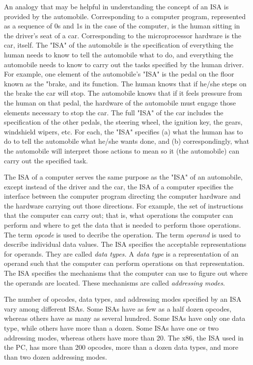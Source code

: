 \documentclass{patt}
\begin{document}
An analogy that may be helpful in understanding the concept of an ISA is
provided by the automobile.  Corresponding to a computer program, 
represented as a sequence of 0s and 1s in the case of the computer, is 
the human sitting in the driver's seat of a car.  Corresponding to the 
microprocessor hardware is the car, itself.  The "ISA" of the automobile is 
the specification of everything 
the human needs to know to tell the automobile what to do, and everything 
the automobile needs to know to carry out the tasks specified by the human 
driver.  For example, one element of the automobile's "ISA" is the pedal 
on the floor known as the "brake, and its function.  The human knows that 
if he/she steps on the brake the car will stop.  The automobile knows that 
if it feels pressure from the human on that pedal, the hardware of the 
automobile must engage those elements necessary to stop the car.  The full 
"ISA" of the car includes the specification of the other pedals, the 
steering wheel, the ignition key, the gears, windshield wipers, etc.  
For each, the "ISA" specifies (a) what the human has to do to tell the 
automobile what he/she wants done, and (b) correspondingly, what the 
automobile will interpret those actions to mean so it (the automobile) 
can carry out the specified task.

The ISA of a computer serves the same purpose as the "ISA" of an automobile,
except instead of the driver and the car, the ISA of a computer specifies 
the interface between the computer program directing the computer hardware
and the hardware carrying out those directions.  For example, the set of
instructions that the computer can carry out; that is, what operations the
computer can perform and where to get the data that is needed to perform those
operations.  The 
term {\em opcode} is used to decribe the operation.  The term {\em operand} 
is used to describe individual data values.  The ISA specifies the
acceptable representations for operands.  They are called
{\em data types.} A {\em data type} is
a representation of an operand such that the computer can perform operations
on that representation.  The ISA specifies the mechanisms that the computer 
can use to figure out where the operands are located.
These mechanisms are called {\em addressing modes}.

The number of opcodes, data types, and addressing modes specified by an ISA
vary among different ISAs. Some ISAs have as few as a half dozen opcodes,
whereas others have as many as several hundred.  Some ISAs have only one 
data type,
while others have more than a dozen.  Some ISAs have one or two addressing
modes, whereas others have more than 20.  The x86, the ISA used in the PC,  
has more than 200 opcodes, more than a dozen data types, and more than 
two dozen addressing modes.
\end{document}
